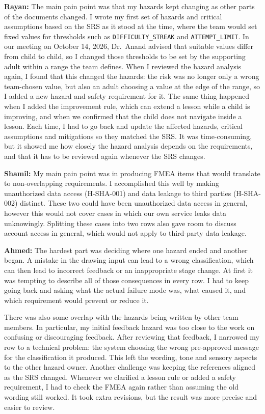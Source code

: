 \documentclass{article}
\begin{document}
\begin{enumerate}
\textbf{Rayan:} The main pain point was that my hazards kept changing as other
parts of the documents changed. I wrote my first set of hazards and critical
assumptions based on the SRS as it stood at the time, where the team would set
fixed values for thresholds such as \texttt{DIFFICULTY\_STREAK} and
\texttt{ATTEMPT\_LIMIT}. In our meeting on October 14, 2026, Dr.~Anand advised
that suitable values differ from child to child, so I changed those thresholds
to be set by the supporting adult within a range the team defines. When I
reviewed the hazard analysis again, I found that this changed the hazards: the
risk was no longer only a wrong team-chosen value, but also an adult choosing a
value at the edge of the range, so I added a new hazard and safety requirement
for it. The same thing happened when I added the improvement rule, which can
extend a lesson while a child is improving, and when we confirmed that the child
does not navigate inside a lesson. Each time, I had to go back and update the
affected hazards, critical assumptions and mitigations so they matched the SRS.
It was time-consuming, but it showed me how closely the hazard analysis depends
on the requirements, and that it has to be reviewed again whenever the SRS
changes.

\textbf{Shamil:} My main pain point was in producing FMEA items that would
translate to non-overlapping requirements. I accomplished this well by making
unauthorized data access (H-SHA-001) and data leakage to third parties
(H-SHA-002) distinct. These two could have been unauthorized data access in
general, however this would not cover cases in which our own service leaks data
unknowingly. Splitting these cases into two rows also gave room to discuss
account access in general, which would not apply to third-party data leakage.

\textbf{Ahmed:} The hardest part was deciding where one hazard ended and another
began. A mistake in the drawing input can lead to a wrong classification, which
can then lead to incorrect feedback or an inappropriate stage change. At first
it was tempting to describe all of those consequences in every row. I had to
keep going back and asking what the actual failure mode was, what caused it, and
which requirement would prevent or reduce it.

There was also some overlap with the hazards being written by other team
members. In particular, my initial feedback hazard was too close to the work on
confusing or discouraging feedback. After reviewing that feedback, I narrowed my
row to a technical problem: the system choosing the wrong pre-approved message
for the classification it produced. This left the wording, tone and sensory
aspects to the other hazard owner. Another challenge was keeping the references
aligned as the SRS changed. Whenever we clarified a lesson rule or added a
safety requirement, I had to check the FMEA again rather than assuming the old
wording still worked. It took extra revisions, but the result was more precise
and easier to review.


\end{enumerate}
\end{document}
